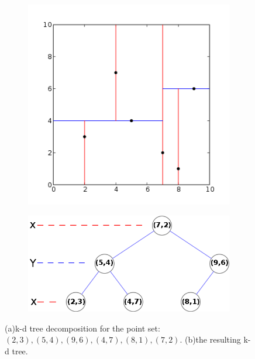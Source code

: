 \begin{figure}
\begin{center}
	\begin{subfigure}[b]{.48\textwidth}
		\includegraphics[width=1.\textwidth]{graphics/pm/pm-5-1}
		\caption{}
	\end{subfigure}
	\begin{subfigure}[b]{.48\textwidth}
		\includegraphics[width=1.\textwidth]{graphics/pm/pm-5-4}
		\caption{}
	\end{subfigure}
\end{center}
\caption{(a)k-d tree decomposition for the point set: $(2,3), (5,4), (9,6), (4,7), (8,1), (7,2)$. (b)the resulting k-d tree.}
\label{f:photon-kd-tree}
\end{figure}

